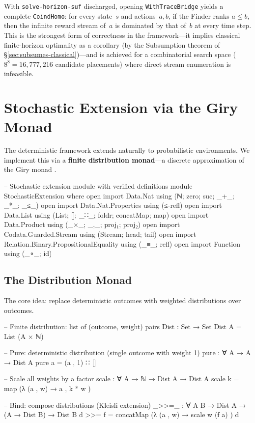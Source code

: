 \documentclass[9pt,a4paper]{article}
\theoremstyle{plain}
\theoremstyle{definition}
\theoremstyle{remark}
\begin{document}
\noindent With \texttt{solve-horizon-suf} discharged, opening \texttt{WithTraceBridge} yields a complete \texttt{CoindHomo}: for every state~$s$ and actions~$a, b$, if the Finder ranks $a \le b$, then the infinite reward stream of~$a$ is dominated by that of~$b$ at every time step.  This is the strongest form of correctness in the framework---it implies classical finite-horizon optimality as a corollary (by the Subsumption theorem of \S\ref{sec:subsumes-classical})---and is achieved for a combinatorial search space ($8^8 = 16{,}777{,}216$ candidate placements) where direct stream enumeration is infeasible.


\section{Stochastic Extension via the Giry Monad}\label{sec:stochastic}

The deterministic framework extends naturally to probabilistic environments. We implement this via a \textbf{finite distribution monad}---a discrete approximation of the Giry monad \cite{Giry1982}.

\begin{code}[hide]
-- Stochastic extension module with verified definitions
module StochasticExtension where
  open import Data.Nat using (ℕ; zero; suc; _+_; _*_; _≤_)
  open import Data.Nat.Properties using (≤-refl)
  open import Data.List using (List; []; _∷_; foldr; concatMap; map)
  open import Data.Product using (_×_; _,_; proj₁; proj₂)
  open import Codata.Guarded.Stream using (Stream; head; tail)
  open import Relation.Binary.PropositionalEquality using (_≡_; refl)
  open import Function using (_∘_; id)
\end{code}

\subsection{The Distribution Monad}

The core idea: replace deterministic outcomes with weighted distributions over outcomes.

\begin{code}
  -- Finite distribution: list of (outcome, weight) pairs
  Dist : Set → Set
  Dist A = List (A × ℕ)

  -- Pure: deterministic distribution (single outcome with weight 1)
  pure : ∀ {A} → A → Dist A
  pure a = (a , 1) ∷ []

  -- Scale all weights by a factor
  scale : ∀ {A} → ℕ → Dist A → Dist A
  scale k = map (λ { (a , w) → a , k * w })

  -- Bind: compose distributions (Kleisli extension)
  _>>=_ : ∀ {A B} → Dist A → (A → Dist B) → Dist B
  d >>= f = concatMap (λ { (a , w) → scale w (f a) }) d
\end{code}
\end{document}
